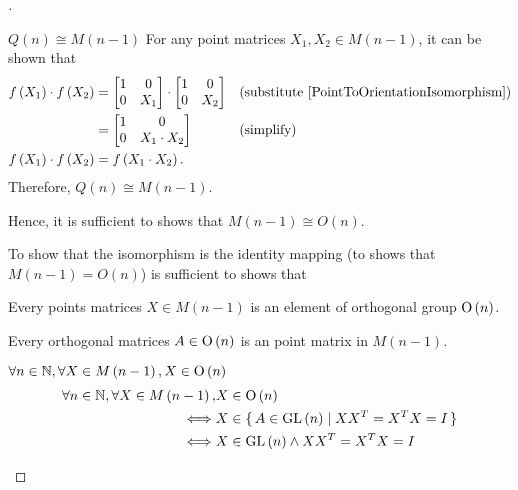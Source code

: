 \documentclass[stu, babel, american, biblatex, a4paper, draftall]{apa7}
\begin{document}
\begin{proof}[]
\begin{subproof}{$Q\left(n\right)\cong M\left(n-1\right)$}
        For any point matrices $X_1, X_2 \in M\left(n-1\right)$, it can be shown that
        \begin{align}
            f\left(X_1\right)\cdot f\left(X_2\right)
                                                     & =\begin{bmatrix}
                1 & 0   \\
                0 & X_1 \\
            \end{bmatrix}\cdot\begin{bmatrix}
                1 & 0   \\
                0 & X_2 \\
            \end{bmatrix}                         &  & \text{(substitute \cref{PointToOrientationIsomorphism})} \nonumber \\
                                                     & =\begin{bmatrix}
                1 & 0            \\
                0 & X_1\cdot X_2 \\
            \end{bmatrix}                                                        &  & \text{(simplify)} \nonumber                                        \\
            f\left(X_1\right)\cdot f\left(X_2\right) & = f\left(X_1\cdot X_2\right)\text{.} \label{PointToOrientationIsomorphismProperty}
        \end{align}
        Therefore, $Q\left(n\right)\cong M\left(n-1\right)$.
    \end{subproof}

    Hence, it is sufficient to shows that $M\left(n-1\right)\cong O\left(n\right)$.

    To show that the isomorphism is the identity mapping
    (to shows that $M\left(n-1\right)=O\left(n\right)$)
    is sufficient to shows that
    \begin{APAenumerate}
        \item Every points matrices $X \in M\left(n-1\right)$ is an element of orthogonal group $\operatorname{O}\left(n\right)$.
        \item Every orthogonal matrices $A \in \operatorname{O}\left(n\right)$ is an point matrix in $M\left(n-1\right)$.
    \end{APAenumerate}
    \begin{subproof}{$\forall n\in\mathbb{N}, \forall X\in M\left(n-1\right), X\in \operatorname{O}\left(n\right)$}
        \begin{align*}
            \forall n\in\mathbb{N}, \forall X\in M\left(n-1\right),
                 & X\in \operatorname{O}\left(n\right)                                  \\
            \iff & X\in \set{A\in\operatorname{GL}\left(n\right)\mid X X^T = X^T X = I} \\
            \iff & X\in\operatorname{GL}\left(n\right) \wedge X X^T = X^T X = I
        \end{align*}


\end{subproof}
\end{proof}
\end{document}
